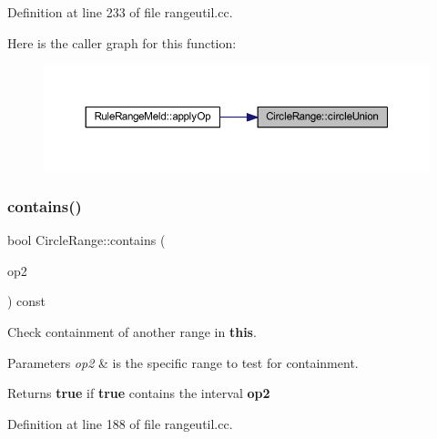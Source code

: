 Definition at line 233 of file rangeutil.\+cc.

Here is the caller graph for this function\+:
\nopagebreak
\begin{figure}[H]
\begin{center}
\leavevmode
\includegraphics[width=350pt]{class_circle_range_a286db51910f20ec7624132f8298cfe9b_icgraph}
\end{center}
\end{figure}
\mbox{\label{class_circle_range_a9973f2c914dcfe8760079aaa0459d758}} 
\subsubsection{\texorpdfstring{contains()}{contains()}\hspace{0.1cm}{\footnotesize\ttfamily [1/2]}}
{\footnotesize\ttfamily bool Circle\+Range\+::contains (\begin{DoxyParamCaption}\item[{const \mbox{\hyperlink{class_circle_range}{Circle\+Range}} \&}]{op2 }\end{DoxyParamCaption}) const}



Check containment of another range in {\bfseries{this}}. 


\begin{DoxyParams}{Parameters}
{\em op2} & is the specific range to test for containment. \\
\hline
\end{DoxyParams}
\begin{DoxyReturn}{Returns}
{\bfseries{true}} if {\bfseries{true}} contains the interval {\bfseries{op2}} 
\end{DoxyReturn}


Definition at line 188 of file rangeutil.\+cc.

